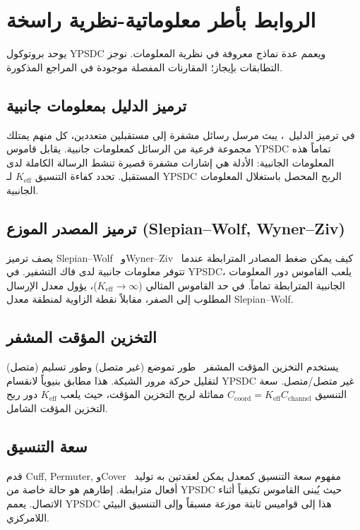 \documentclass[12pt,a4paper]{article}
\theoremstyle{remark}
\begin{document}
	\section{الروابط بأطر معلوماتية-نظرية راسخة}
	\label{sec:classical-connections}
	
	يوحد بروتوكول YPSDC ويعمم عدة نماذج معروفة في نظرية المعلومات. نوجز التطابقات بإيجاز؛ المقارنات المفصلة موجودة في المراجع المذكورة.
	
	\subsection*{ترميز الدليل بمعلومات جانبية}
	في ترميز الدليل~\cite{Birk1998,BarYossef2011}، يبث مرسل رسائل مشفرة إلى مستقبلين متعددين، كل منهم يمتلك مجموعة فرعية من الرسائل كمعلومات جانبية. يقابل قاموس YPSDC تماماً هذه المعلومات الجانبية: الأدلة هي إشارات مشفرة قصيرة تنشط الرسالة الكاملة لدى المستقبل. تحدد كفاءة التنسيق \(K_{\mathrm{eff}}\) لـ YPSDC الربح المحصل باستغلال المعلومات الجانبية.
	
	\subsection*{ترميز المصدر الموزع (Slepian–Wolf, Wyner–Ziv)}
	يصف ترميز Slepian–Wolf~\cite{SlepianWolf1973} وWyner–Ziv~\cite{WynerZiv1976} كيف يمكن ضغط المصادر المترابطة عندما تتوفر معلومات جانبية لدى فاك التشفير. في YPSDC، يلعب القاموس دور المعلومات الجانبية المترابطة تماماً. في حد القاموس المثالي (\(K_{\mathrm{eff}} \to \infty\))، يؤول معدل الإرسال المطلوب إلى الصفر، مقابلاً نقطة الزاوية لمنطقة معدل Slepian–Wolf.
	
	\subsection*{التخزين المؤقت المشفر}
	يستخدم التخزين المؤقت المشفر~\cite{MaddahAli2014} طور تموضع (غير متصل) وطور تسليم (متصل) لتقليل حركة مرور الشبكة. هذا مطابق بنيوياً لانقسام YPSDC غير متصل/متصل. سعة التنسيق \(C_{\mathrm{coord}} = K_{\mathrm{eff}} C_{\mathrm{channel}}\) مماثلة لربح التخزين المؤقت، حيث يلعب \(K_{\mathrm{eff}}\) دور ربح التخزين المؤقت الشامل.
	
	\subsection*{سعة التنسيق}
	قدم Cuff, Permuter, وCover~\cite{Cuff2013} مفهوم سعة التنسيق كمعدل يمكن لعقدتين به توليد أفعال مترابطة. إطارهم هو حالة خاصة من YPSDC حيث يُبنى القاموس تكيفياً أثناء الاتصال. يعمم YPSDC هذا إلى قواميس ثابتة موزعة مسبقاً وإلى التنسيق البيئي اللامركزي.
	
\end{document}
